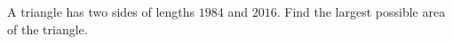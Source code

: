 A triangle has two sides of lengths $1984$ and $2016$. Find the largest possible area of the triangle.
